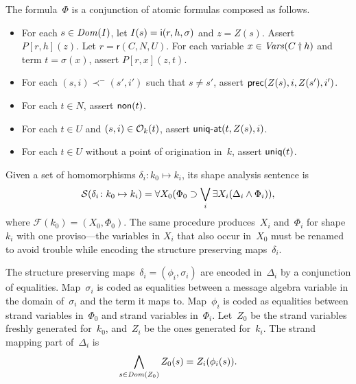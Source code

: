 \documentclass[12pt]{report}
\theoremstyle{definition}
\newcommand{\sdom}{\fn{Dom}}
\newcommand{\svars}{\fn{Vars}}
\newcommand{\role}{\mathsf{r}}
\newcommand{\form}{\mathcal{F}}
\newcommand{\sent}{\mathcal{S}}
\begin{document}
The formula~$\Phi$ is a conjunction of atomic formulas composed as
follows.
\begin{itemize}
\item For each $s\in\sdom(I)$, let $I(s)=\operatorname{\mathsf{i}}(r,h,\sigma)$ and
  $z=Z(s)$.  Assert $P[r,h](z)$.  Let $r=\role(C,N,U)$.  For each
  variable $x\in\svars(\prefix{C}{h})$ and term $t=\sigma(x)$, assert
  $P[r,x](z,t)$.
\item For each $(s,i)\prec^-(s',i')$ such that $s\neq s'$, assert
  $\operatorname{\mathsf{prec}}(Z(s),i,Z(s'),i')$.
\item For each $t\in N$, assert $\operatorname{\mathsf{non}}(t)$.
\item For each $t\in U$ and $(s,i)\in\mathcal{O}_k(t)$, assert
  $\operatorname{\mathsf{\mbox{\sf uniq-at}}}(t,Z(s),i)$.
\item For each $t\in U$ without a point of origination in~$k$, assert
  $\operatorname{\mathsf{uniq}}(t)$.
\end{itemize}

Given a set of homomorphisms $\delta_i\colon k_0\mapsto k_i$, its shape
analysis sentence is
\begin{equation}\label{eqn:node-oriented shape sentence}
\sent(\delta_i\colon k_0\mapsto k_i)=\all{X_0}(\Phi_0\supset
\bigvee_i\some{X_i}(\Delta_i\wedge\Phi_i)),
\end{equation}
where $\form(k_0)=(X_0,\Phi_0)$.  The same procedure produces~$X_i$
and~$\Phi_i$ for shape~$k_i$ with one proviso---the variables in
$X_i$ that also occur in~$X_0$ must be renamed to avoid trouble while
encoding the structure preserving maps~$\delta_i$.

The structure preserving maps~$\delta_i=(\phi_i,\sigma_i)$ are encoded
in~$\Delta_i$ by a conjunction of equalities.  Map~$\sigma_i$ is coded
as equalities between a message algebra variable in the domain
of~$\sigma_i$ and the term it maps to.  Map~$\phi_i$ is coded as
equalities between strand variables in~$\Phi_0$ and strand variables
in~$\Phi_i$.  Let~$Z_0$ be the strand variables freshly generated
for~$k_0$, and~$Z_i$ be the ones generated for~$k_i$.  The
strand mapping part of~$\Delta_i$ is
\[\bigwedge_{s\in\sdom(Z_0)}Z_0(s)=Z_i(\phi_i(s)).\]
\end{document}
